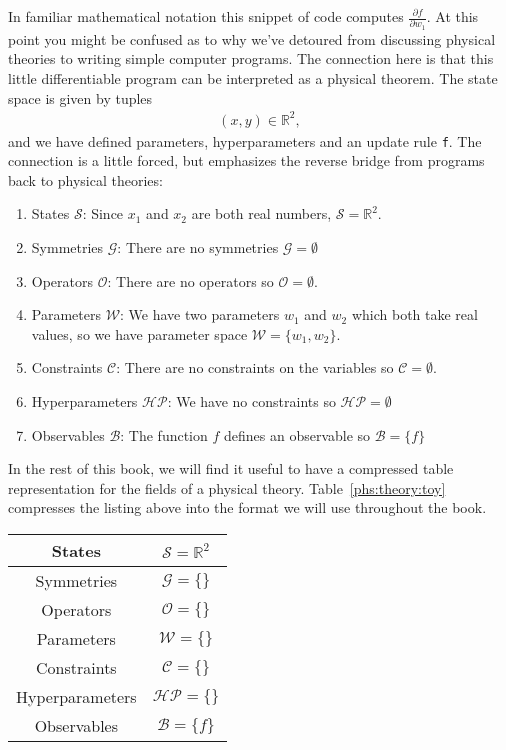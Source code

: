 \documentclass[book.tex]{subfiles}
\begin{document}
In familiar mathematical notation this snippet of code computes $\frac{\partial f}{\partial w_1}$. At this point you might be confused as to why we've detoured from discussing physical theories to writing simple computer programs. The connection here is that this little differentiable program can be interpreted as a physical theorem. The state space is given by tuples
\begin{align}
(x, y) \in \mathbb{R}^2,
\end{align}
and we have defined parameters, hyperparameters and an update rule \lstinline{f}. The connection is a little forced, but emphasizes the reverse bridge from programs back to physical theories: 
\begin{enumerate}
    \item States $\mathcal{S}$: Since $x_1$ and $x_2$ are both real numbers, $\mathcal{S} = \mathbb{R}^2$.
    \item Symmetries $\mathcal{G}$: There are no symmetries $\mathcal{G} = \emptyset$
    \item Operators $\mathcal{O}$: There are no operators so $\mathcal{O} = \emptyset$.
    \item Parameters $\mathcal{W}$: We have two parameters $w_1$ and $w_2$ which both take real values, so we have parameter space $\mathcal{W} = \{w_1, w_2\}$.
    \item Constraints $\mathcal{C}$: There are no constraints on the variables so $\mathcal{C} = \emptyset$.
    \item Hyperparameters $\mathcal{HP}$: We have no constraints so $\mathcal{HP} = \emptyset$
    \item Observables $\mathcal{B}$: The function $f$ defines an observable so $\mathcal{B} = \{f\}$
\end{enumerate}
In the rest of this book, we will find it useful to have a compressed table representation for the fields of a physical theory. Table~\ref{phs:theory:toy} compresses the listing above into the format we will use throughout the book.
\begin{center}
\begin{tabular}{|c|c|}
    \hline
    States & $\mathcal{S} = \mathbb{R}^2 $ \\
    \hline
    Symmetries & $\mathcal{G} = \{\}$\\
    \hline
    Operators & $\mathcal{O} = \{\} $\\
    \hline
    Parameters & $\mathcal{W} = \{\}$ \\
    \hline
    Constraints & $\mathcal{C} =  \{\}$ \\
    \hline
    Hyperparameters & $\mathcal{HP} = \{\}$  \\
    \hline
    Observables & $\mathcal{B} = \{f\}$  \\
    \hline
\end{tabular}
\label{phs:theory:toy}
\end{center}
\end{document}
